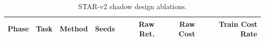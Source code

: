 \begin{table}[t]
\centering
\caption{STAR-v2 shadow design ablations.}
\label{tab:star-v2-shadow-design}
\begin{tabular}{lllrrrr}
\toprule
Phase & Task & Method & Seeds & Raw Ret. & Raw Cost & Train Cost Rate \\
\midrule
\bottomrule
\end{tabular}
\end{table}
